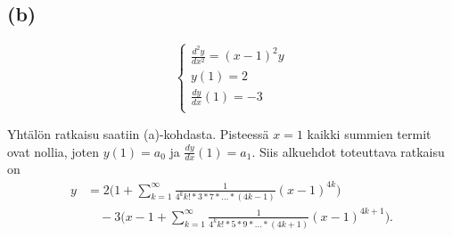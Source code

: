 \documentclass{article}
\begin{document}
\subsection*{(b)}

\[
  \begin{cases}
    \frac{d^2 y}{d x^2} = (x-1)^2y \\
    y(1) = 2 \\
    \frac{dy}{dx}(1) = -3 \\
  \end{cases}
\]

Yhtälön ratkaisu saatiin (a)-kohdasta.
Pisteessä $x = 1$ kaikki summien termit ovat nollia, joten
$y(1) = a_0$ ja $\frac{dy}{dx}(1) = a_1$.
Siis alkuehdot toteuttava ratkaisu on
\begin{align*}
  y &= 2\Big(1 + \sum_{k=1}^{\infty}\frac{1}{4^kk!*3*7*\dots*(4k-1)} (x-1)^{4k}\Big) \\
    &\quad- 3\Big(x-1 + \sum_{k=1}^{\infty}\frac{1}{4^kk!*5*9*\dots*(4k+1)} (x-1)^{4k+1}\Big).
\end{align*}
\end{document}
